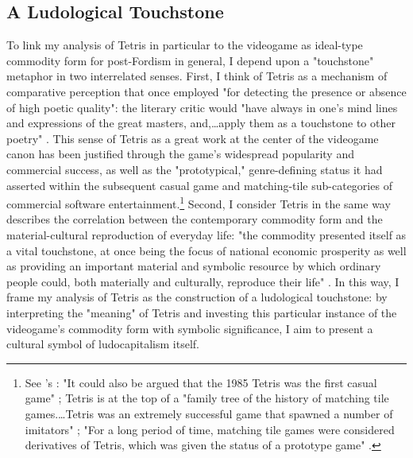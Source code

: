 \subsection*{A Ludological Touchstone}
To link my analysis of Tetris in particular to the videogame as ideal-type commodity form for post-Fordism in general, I depend upon a "touchstone" metaphor in two interrelated senses. First, I think of Tetris as a mechanism of comparative perception that \citeauthor{Arnold1909-qu} once employed "for detecting the presence or absence of high poetic quality": the literary critic would "have always in one's mind lines and expressions of the great masters, and,…apply them as a touchstone to other poetry" \autocite*[10]{Arnold1909-qu}. This sense of Tetris as a great work at the center of the videogame canon has been justified through the game's widespread popularity and commercial success, as well as the "prototypical," genre-defining status it had asserted within the subsequent casual game and matching-tile sub-categories of commercial software entertainment.\footnote{
  See \citeauthor{Juul2009}'s : "It could also be argued that the 1985 Tetris was the first casual game" \autocite[27]{Juul2009}; Tetris is at the top of a "family tree of the history of matching tile games.…Tetris was an extremely successful game that spawned a number of imitators" \autocite[86--7]{Juul2009}; "For a long period of time, matching tile games were considered derivatives of Tetris, which was given the status of a prototype game" \autocite[98]{Juul2009}.
  }
Second, I consider Tetris in the same way \citeauthor{Lee2003} describes the correlation between the contemporary commodity form and the material-cultural reproduction of everyday life: "the commodity presented itself as a vital touchstone, at once being the focus of national economic prosperity as well as providing an important material and symbolic resource by which ordinary people could, both materially and culturally, reproduce their life" \autocite[x]{Lee2003}. In this way, I frame my analysis of Tetris as the construction of a ludological touchstone: by interpreting the "meaning" of Tetris and investing this particular instance of the videogame's commodity form with symbolic significance, I aim to present a cultural symbol of ludocapitalism itself.

